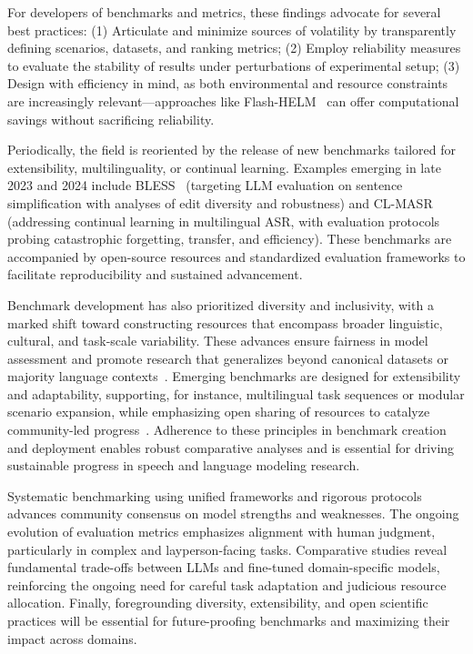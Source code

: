 \documentclass[sigconf]{acmart}
\begin{document}
For developers of benchmarks and metrics, these findings advocate for several best practices: (1) Articulate and minimize sources of volatility by transparently defining scenarios, datasets, and ranking metrics; (2) Employ reliability measures to evaluate the stability of results under perturbations of experimental setup; (3) Design with efficiency in mind, as both environmental and resource constraints are increasingly relevant—approaches like Flash-HELM~\cite{ref104} can offer computational savings without sacrificing reliability.

Periodically, the field is reoriented by the release of new benchmarks tailored for extensibility, multilinguality, or continual learning. Examples emerging in late 2023 and 2024 include BLESS~\cite{ref106} (targeting LLM evaluation on sentence simplification with analyses of edit diversity and robustness) and CL-MASR~\cite{ref102} (addressing continual learning in multilingual ASR, with evaluation protocols probing catastrophic forgetting, transfer, and efficiency). These benchmarks are accompanied by open-source resources and standardized evaluation frameworks to facilitate reproducibility and sustained advancement.

Benchmark development has also prioritized diversity and inclusivity, with a marked shift toward constructing resources that encompass broader linguistic, cultural, and task-scale variability. These advances ensure fairness in model assessment and promote research that generalizes beyond canonical datasets or majority language contexts~\cite{ref106}. Emerging benchmarks are designed for extensibility and adaptability, supporting, for instance, multilingual task sequences or modular scenario expansion, while emphasizing open sharing of resources to catalyze community-led progress~\cite{ref102,ref104,ref106}. Adherence to these principles in benchmark creation and deployment enables robust comparative analyses and is essential for driving sustainable progress in speech and language modeling research.

Systematic benchmarking using unified frameworks and rigorous protocols advances community consensus on model strengths and weaknesses. The ongoing evolution of evaluation metrics emphasizes alignment with human judgment, particularly in complex and layperson-facing tasks. Comparative studies reveal fundamental trade-offs between LLMs and fine-tuned domain-specific models, reinforcing the ongoing need for careful task adaptation and judicious resource allocation. Finally, foregrounding diversity, extensibility, and open scientific practices will be essential for future-proofing benchmarks and maximizing their impact across domains.
\end{document}
